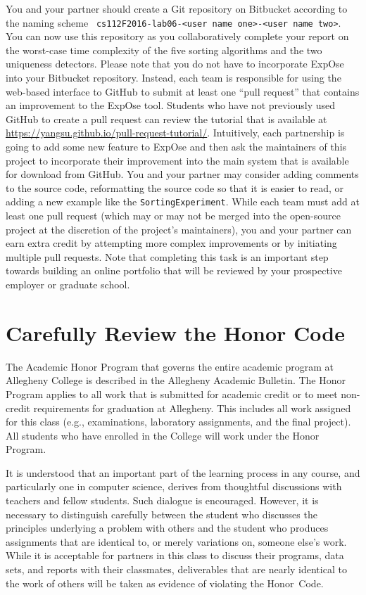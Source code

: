 You and your partner should create a Git repository on Bitbucket according to the naming scheme {\tt
cs112F2016-lab06-<user name one>-<user name two>}. You can now use this repository as you collaboratively complete your
report on the worst-case time complexity of the five sorting algorithms and the two uniqueness detectors. Please note
that you do not have to incorporate {\sc ExpOse} into your Bitbucket repository. Instead, each team is responsible for
using the web-based interface to GitHub to submit at least one ``pull request'' that contains an improvement to the {\sc
ExpOse} tool. Students who have not previously used GitHub to create a pull request can review the tutorial that is
available at \url{https://yangsu.github.io/pull-request-tutorial/}. Intuitively, each partnership is going to add some
new feature to {\sc ExpOse} and then ask the maintainers of this project to incorporate their improvement into the main
system that is available for download from GitHub. You and your partner may consider adding comments to the source code,
reformatting the source code so that it is easier to read, or adding a new example like the {\tt SortingExperiment}.
While each team must add at least one pull request (which may or may not be merged into the open-source project at the
discretion of the project's maintainers), you and your partner can earn extra credit by attempting more complex
improvements or by initiating multiple pull requests. Note that completing this task is an important step towards
building an online portfolio that will be reviewed by your prospective employer or graduate school.

\section*{Carefully Review the Honor Code}

The Academic Honor Program that governs the entire academic program at Allegheny College is described in the Allegheny
Academic Bulletin. The Honor Program applies to all work that is submitted for academic credit or to meet non-credit
requirements for graduation at Allegheny. This includes all work assigned for this class (e.g., examinations, laboratory
assignments, and the final project). All students who have enrolled in the College will work under the Honor Program.

\noindent It is understood that an important part of the learning process in any course, and particularly one in
computer science, derives from thoughtful discussions with teachers and fellow students.  Such dialogue is encouraged.
However, it is necessary to distinguish carefully between the student who discusses the principles underlying a problem
with others and the student who produces assignments that are identical to, or merely variations on, someone else's
work. While it is acceptable for partners in this class to discuss their programs, data sets, and reports with their
classmates, deliverables that are nearly identical to the work of others will be taken as evidence of violating the
\mbox{Honor Code}.

